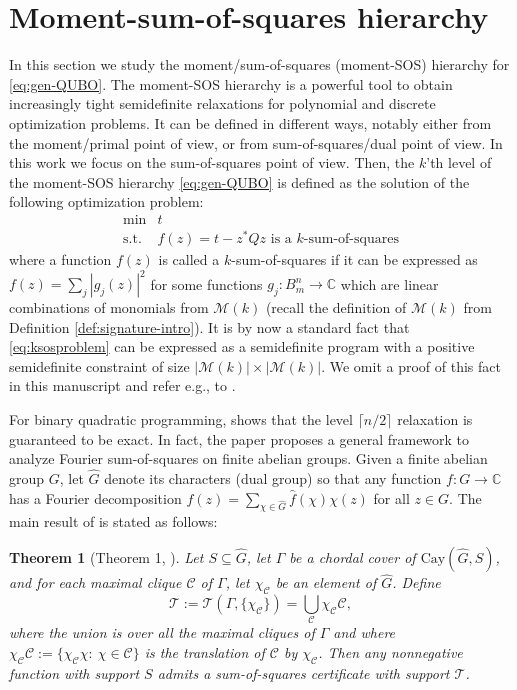 \documentclass{article}
\newcommand{\CC}{\mathbb{C}}
\newcommand{\cM}{\mathcal{M}}
\newtheorem{theorem}{Theorem}
\theoremstyle{definition}
\begin{document}
\section{Moment-sum-of-squares hierarchy}\label{sec:m-sos}

In this section we study the moment/sum-of-squares (moment-SOS) hierarchy for \eqref{eq:gen-QUBO}. The moment-SOS hierarchy is a powerful tool to obtain increasingly tight semidefinite relaxations for polynomial and discrete optimization problems. It can be defined in different ways, notably either from the moment/primal point of view, or from sum-of-squares/dual point of view. In this work we focus on the sum-of-squares point of view. Then, the $k$'th level of the moment-SOS hierarchy \eqref{eq:gen-QUBO} is defined as the solution of the following optimization problem:
\begin{equation}
\label{eq:ksosproblem}
\begin{array}{ll}
\min & t\\
\text{s.t.} & f(z) = t - z^*Qz \text{ is a $k$-sum-of-squares}
\end{array}
\end{equation}
where a function $f(z)$ is called a $k$-sum-of-squares if it can be expressed as $f(z) = \sum_{j} |g_j(z)|^2$ for some functions $g_j:B_m^n \to \CC$ which are linear combinations of monomials from $\cM(k)$ (recall the definition of $\cM(k)$ from Definition \ref{def:signature-intro}). It is by now a standard fact that \eqref{eq:ksosproblem} can be expressed as a semidefinite program with a positive semidefinite constraint of size $|\cM(k)|\times |\cM(k)|$. We omit a proof of this fact in this manuscript and refer e.g., to \cite{fawzi2016sparse}.

For binary quadratic programming, \cite{fawzi2016sparse} shows that the level $\lceil n/2\rceil$ relaxation is guaranteed to be exact. In fact, the paper \cite{fawzi2016sparse} proposes a general framework to analyze Fourier sum-of-squares on finite abelian groups. Given a finite abelian group $G$, let $\hat{G}$ denote its characters (dual group) so that any function $f:G\to\CC$ has a Fourier decomposition $f(z)=\sum_{\chi\in \hat{G}}\hat{f}(\chi)\chi(z)$ for all $z \in G$. The main result of \cite{fawzi2016sparse} is stated as follows: 

\begin{theorem}[Theorem 1, \cite{fawzi2016sparse}]\label{thm:fsos}
    Let $S\subseteq \hat{G}$, let $\Gamma$ be a chordal cover of $\text{Cay}(\hat{G},S)$, and for each maximal clique $\mathcal{C}$ of $\Gamma$, let $\chi_{\mathcal{C}}$ be an element of $\hat{G}$. Define
    \[
    \mathcal{T}:=\mathcal{T}(\Gamma,\{\chi_{\mathcal{C}}\})=\bigcup_{\mathcal{C}} \chi_{\mathcal{C}} \mathcal{C},
    \]
    where the union is over all the maximal cliques of $\Gamma$ and where $\chi_{\mathcal{C}} \mathcal{C}:=\{\chi_{\mathcal{C}}\chi:~\chi\in \mathcal{C}\}$ is the translation of $\mathcal{C}$ by $\chi_{\mathcal{C}}$. Then any nonnegative function with support $S$ admits a sum-of-squares certificate with support $\mathcal{T}$. 
\end{theorem}
\end{document}
